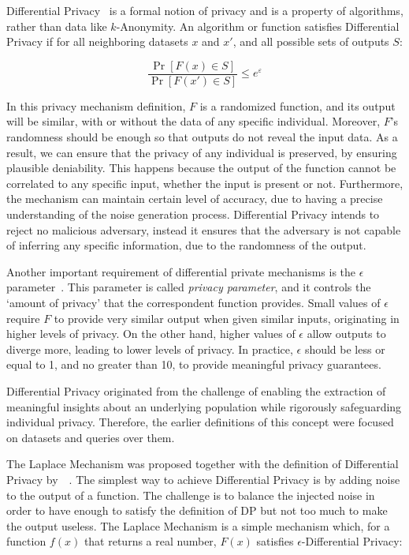Differential Privacy~\cite*{DifPrivacy, DifPrivacyCalNoise, DP_Book} is a formal notion of privacy and is a property of algorithms, rather than data like \(k\)-Anonymity. An algorithm or function satisfies Differential Privacy if for all neighboring datasets \(x\) and \(x'\), and all possible sets of outputs \(S\):

\begin{equation}\label{eq:dp_privacy_mechanism}
    \frac{\Pr[F(x) \in S]}{\Pr[F(x') \in S]} \leq e^{\varepsilon}
\end{equation}

In this privacy mechanism definition, \(F\) is a randomized function, and its output will be similar, with or without the data of any specific individual. Moreover, \(F\)'s randomness should be enough so that outputs do not reveal the input data. As a result, we can ensure that the privacy of any individual is preserved, by ensuring plausible deniability. This happens because the output of the function cannot be correlated to any specific input, whether the input is present or not. Furthermore, the mechanism can maintain certain level of accuracy, due to having a precise understanding of the noise generation process. Differential Privacy intends to reject no malicious adversary, instead it ensures that the adversary is not capable of inferring any specific information, due to the randomness of the output.

Another important requirement of differential private mechanisms is the \(\epsilon\) parameter~\cite{DP_Book, DifPrivacyCalNoise, AlgFoundationsDP, DifPrivacy}. This parameter is called \textit{privacy parameter}, and it controls the `amount of privacy' that the correspondent function provides. Small values of \(\epsilon\) require \(F\) to provide very similar output when given similar inputs, originating in higher levels of privacy. On the other hand, higher values of \(\epsilon\) allow outputs to diverge more, leading to lower levels of privacy. In practice, \(\epsilon\) should be less or equal to 1, and no greater than 10, to provide meaningful privacy guarantees. 

Differential Privacy originated from the challenge of enabling the extraction of meaningful insights about an underlying population while rigorously safeguarding individual privacy. Therefore, the earlier definitions of this concept were focused on datasets and queries over them. 


The Laplace Mechanism was proposed together with the definition of Differential Privacy by~\citeauthor{DifPrivacyCalNoise}~\cite{DifPrivacyCalNoise}. The simplest way to achieve Differential Privacy is by adding noise to the output of a function. The challenge is to balance the injected noise in order to have enough to satisfy the definition of DP but not too much to make the output useless. The Laplace Mechanism is a simple mechanism which, for a function \(f(x)\) that returns a real number, \(F(x)\) satisfies \(\epsilon\)-Differential Privacy:

